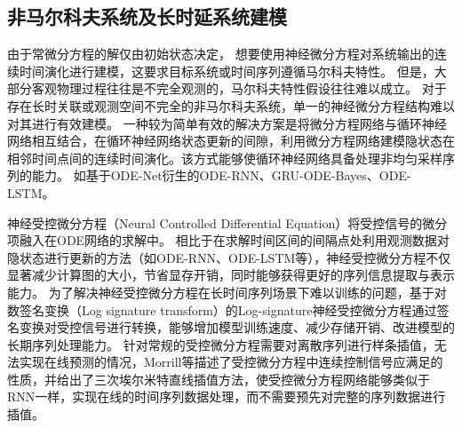 

\subsection{非马尔科夫系统及长时延系统建模}
由于常微分方程的解仅由初始状态决定，
想要使用神经微分方程对系统输出的连续时间演化进行建模，这要求目标系统或时间序列遵循马尔科夫特性。
但是，大部分客观物理过程往往是不完全观测的，马尔科夫特性假设往往难以成立。
对于存在长时关联或观测空间不完全的非马尔科夫系统，单一的神经微分方程结构难以对其进行有效建模。
一种较为简单有效的解决方案是将微分方程网络与循环神经网络相互结合，在循环神经网络状态更新的间隙，利用微分方程网络建模隐状态在相邻时间点间的连续时间演化。该方式能够使循环神经网络具备处理非均匀采样序列的能力。
如基于ODE-Net衍生的ODE-RNN\cite{10.5555/3454287.3454765}、GRU-ODE-Bayes\cite{brouwer2019gru}、ODE-LSTM\cite{lechner2020learning}。

神经受控微分方程（Neural Controlled Differential Equation）\cite{kidger2020neural}将受控信号的微分项融入在ODE网络的求解中。
相比于在求解时间区间的间隔点处利用观测数据对隐状态进行更新的方法（如ODE-RNN、ODE-LSTM等），神经受控微分方程不仅显著减少计算图的大小，节省显存开销，同时能够获得更好的序列信息提取与表示能力。
为了解决神经受控微分方程在长时间序列场景下难以训练的问题，基于对数签名变换（Log signature transform）的Log-signature神经受控微分方程\cite{morrill2021neural}通过签名变换对受控信号进行转换，能够增加模型训练速度、减少存储开销、改进模型的长期序列处理能力。
针对常规的受控微分方程需要对离散序列进行样条插值，无法实现在线预测的情况，Morrill等\cite{morrill2021online}描述了受控微分方程中连续控制信号应满足的性质，并给出了三次埃尔米特直线插值方法，使受控微分方程网络能够类似于RNN一样，实现在线的时间序列数据处理，而不需要预先对完整的序列数据进行插值。

